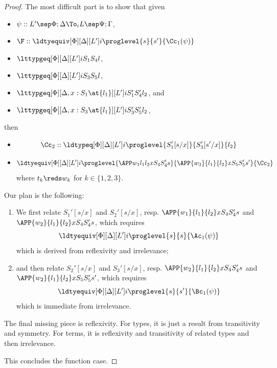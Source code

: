 \begin{proof}
  The most difficult part is to show that given
  \begin{itemize}
  \item $\psi :: L' \sep \Phi;\Delta \To_i L \sep \Psi; \Gamma$,    
  \item $\F :: \ldtyequiv[\Phi][\Delta][L'] i \proglevel {s}{s'}{\Cc_1(\psi)}$
  \item $\lttypgeq[\Phi][\Delta][L'] i{S_1}{S_4}l$,
  \item $\lttypgeq[\Phi][\Delta][L'] i{S_3}{S_5}l$, 
  \item $\lttypgeq[\Phi][\Delta, x : S_1 \at{l_1}][L'] i{S_1'}{S_4'}{l_2}$, and
  \item $\lttypgeq[\Phi][\Delta, x : S_3 \at{l_1}][L'] i{S_3'}{S_5'}{l_2}$,
  \end{itemize}
  then
  \begin{itemize}
  \item
    \[
      \Cc_2 :: \ldtypeq[\Phi][\Delta][L'] i \proglevel{S_1'[s/x]}{S_3'[s'/x]}{l_2}
    \]
  \item 
    \[
      \ldtyequiv[\Phi][\Delta][L'] i \proglevel{\APP w_1{l_1}{l_2} x{S_4}{S_4'} s}{\APP{w_3}{l_1}{l_2}
        x{S_5}{S_5'}{s'}}{\Cc_2}
    \]
    where $t_k \reds w_k$ for $k \in \{1, 2, 3\}$. 
  \end{itemize}
  Our plan is the following:
  \begin{enumerate}
  \item We first relate $S_1'[s/x]$ and $S_2'[s/x]$, resp.
    $\APP {w_1}{l_1}{l_2} x{S_4}{S_4'} s$ and $\APP {w_2}{l_1}{l_2} x{S_4}{S_4'} s$, which
    requires
    \[
      \ldtyequiv[\Phi][\Delta][L'] i \proglevel {s}{s}{\Ac_1(\psi)}
    \]
    which is derived from reflexivity and irrelevance;
  \item and then relate $S_2'[s/x]$ and $S_3'[s/x]$, resp.
    $\APP {w_2}{l_1}{l_2} x{S_4}{S_4'} s$ and $\APP {w_2}{l_1}{l_2} x{S_5}{S_5'}{s'}$,
    which requires
    \[
      \ldtyequiv[\Phi][\Delta][L'] i \proglevel {s}{s'}{\Bc_1(\psi)}
    \]
    which is immediate from irrelevance.
  \end{enumerate}
  The final missing piece is reflexivity. %
  For types, it is just a result from transitivity and symmetry. %
  For terms, it is reflexivity and transitivity of related types and then
  irrelevance. %
  
  This concludes the function case. 
\end{proof}

